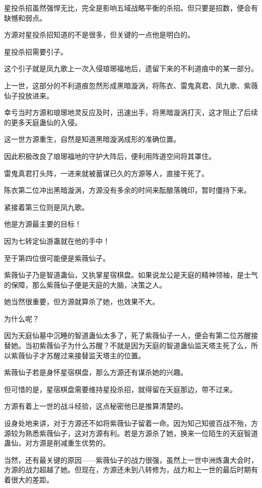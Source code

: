 
\begin{this_body}

星投杀招虽然强悍无比，完全是影响五域战略平衡的杀招。但只要是招数，便会有缺憾和弱点。

方源对星投杀招知道的不是很多，但关键的一点他是明白的。

星投杀招需要引子。

这个引子就是凤九歌上一次入侵琅琊福地后，遗留下来的不利道痕中的某一部分。

上一世，这部分的不利道痕忽然形成黑暗漩涡，将陈衣、雷鬼真君、凤九歌、紫薇仙子投放进来。

幸亏当时方源和琅琊地灵反应及时，迅速出手，将黑暗漩涡打灭，这才阻止了后续的更多天庭蛊仙的入侵。

这一世方源重生，自然是知道黑暗漩涡成形的准确位置。

因此积极改良了琅琊福地的守护大阵后，便利用阵道空间将其罩住。

雷鬼真君打头阵，一进来就被蓄谋已久的方源等人，直接干死了。

陈衣第二位冲出黑暗漩涡，方源没有多余的时间来酝酿落魄印，暂时僵持下来。

紧接着第三位则是凤九歌。

他是方源最主要的目标！

因为七转定仙游蛊就在他的手中！

至于第四位很可能便是紫薇仙子。

紫薇仙子乃是智道蛊仙，又执掌星宿棋盘。如果说龙公是天庭的精神领袖，是士气的保障，那么紫薇仙子便是天庭的大脑，决策之人。

她当然很重要，但方源就算杀了她，也效果不大。

为什么呢？

因为天庭仙墓中沉睡的智道蛊仙太多了，死了紫薇仙子一人，便会有第二位苏醒接替她。当初紫薇仙子为什么苏醒？不就是因为天庭的智道蛊仙监天塔主死了么，所以紫薇仙子才苏醒过来接替监天塔主的位置。

紫薇仙子若是身怀星宿棋盘，那么方源还有谋杀她的兴趣。

但可惜的是，星宿棋盘需要维持星投杀招，就得留在天庭那边，带不过来。

方源有着上一世的战斗经验，这点秘密他已是推算清楚的。

设身处地来讲，对于方源还不如将紫薇仙子留着一命。因为知己知彼百战不殆，方源较为熟悉紫薇仙子，这对方源有利。若是方源杀了她，换来一位陌生的天庭智道蛊仙，对方源是削减重生优势的。

当然，还有最关键的原因——紫薇仙子的战力很强，虽然上一世中洲炼蛊大会时，方源的战力超越了她。但现在，方源还未到八转修为，战力和上一世的最后时期有着很大的差距。


\end{this_body}
